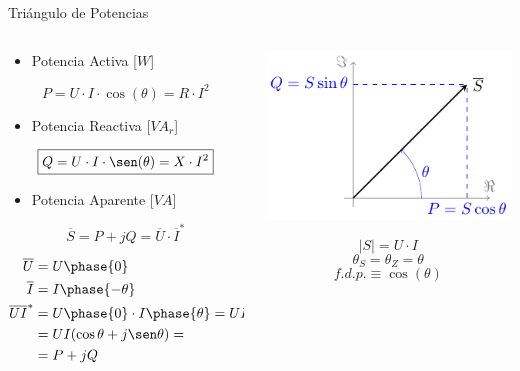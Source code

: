 \documentclass[aspectratio=169, usenames,svgnames,dvipsnames]{beamer}
\begin{document}
\begin{frame}[label={sec:orge5b329a}]{Triángulo de Potencias}
\begin{columns}
\begin{column}{0.4\columnwidth}
\begin{itemize}
\item Potencia Activa [\(W\)]
\end{itemize}
\[  
\boxed{P = U\cdot I\cdot\cos(\theta) = R \cdot I^2}
\]

\begin{itemize}
\item Potencia Reactiva [\(VA_r\)]
\end{itemize}
\[
\boxed{Q = U\cdot I\cdot\sen(\theta) = X \cdot I^2}
\]

\begin{itemize}
\item Potencia Aparente [\(VA\)]
\end{itemize}
\[
\boxed{\overline{S} = P + jQ = \overline{U} \cdot \overline{I}^*}
\]

{\footnotesize\begin{align*}
  \overline{U} &= U\phase{0}\\
  \overline{I} &= I\phase{-\theta}\\
                \overline{U} \overline{I}^* &= U\phase{0} \cdot I\phase{\theta} = UI\phase{\theta}\\
                &= U I (\cos\theta + j \sen\theta) = \\
                &= P + j Q
\end{align*}}
\end{column}

\begin{column}{0.6\columnwidth}
\begin{center}
\includegraphics[width=.9\linewidth]{../figs/trianguloPotencias.pdf}
\end{center}

\[
|S| = U \cdot I
\]
\[
\theta_S = \theta_Z = \theta
\]
\[
f.d.p. \equiv \cos(\theta)
\]
\end{column}
\end{columns}
\end{frame}
\end{document}
